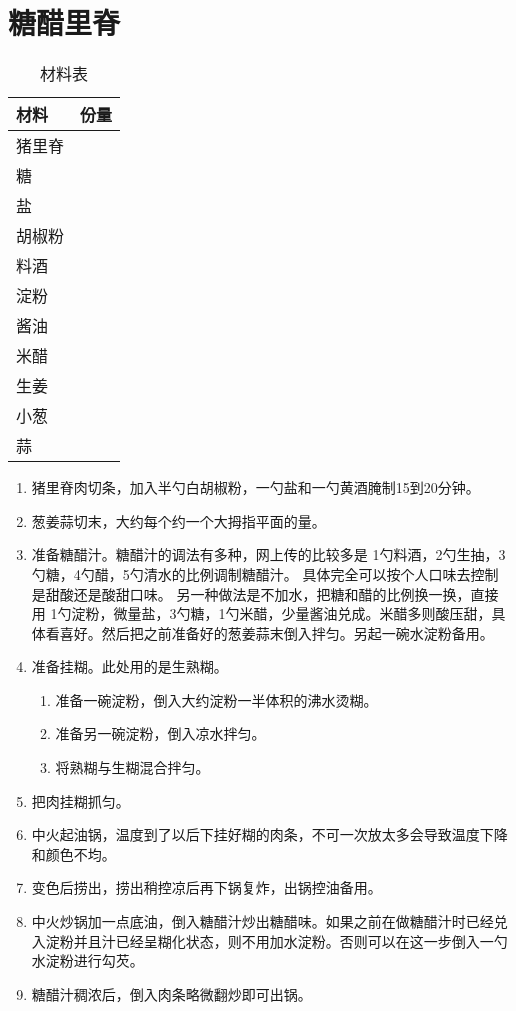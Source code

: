 \section{糖醋里脊}

\begin{table}[h]
    \centering
    \begin{tabular}{|l||c|}\hline
     \textbf{材料}    &  \textbf{份量}\\ \hline\hline
    猪里脊    &  \\ \hline
    糖     &   \\ \hline
    盐     &   \\ \hline
    胡椒粉     &   \\ \hline
    料酒     &   \\ \hline
    淀粉     &   \\ \hline
    酱油     &   \\ \hline
    米醋     &   \\ \hline
    生姜     &   \\ \hline
    小葱     &   \\ \hline
    蒜     &  \\ \hline
    \end{tabular}
    \caption{材料表}
\end{table}


\begin{enumerate}
    \item 猪里脊肉切条，加入半勺白胡椒粉，一勺盐和一勺黄酒腌制15到20分钟。
 
    \item 葱姜蒜切末，大约每个约一个大拇指平面的量。
  
    \item 准备糖醋汁。糖醋汁的调法有多种，网上传的比较多是
    1勺料酒，2勺生抽，3勺糖，4勺醋，5勺清水的比例调制糖醋汁。 具体完全可以按个人口味去控制是甜酸还是酸甜口味。 另一种做法是不加水，把糖和醋的比例换一换，直接用 1勺淀粉，微量盐，3勺糖，1勺米醋，少量酱油兑成。米醋多则酸压甜，具体看喜好。然后把之前准备好的葱姜蒜末倒入拌匀。另起一碗水淀粉备用。
    \item 准备挂糊。此处用的是生熟糊。
    \begin{enumerate}
        \item 准备一碗淀粉，倒入大约淀粉一半体积的沸水烫糊。
        \item 准备另一碗淀粉，倒入凉水拌匀。
        \item 将熟糊与生糊混合拌匀。
    \end{enumerate}
    \item 把肉挂糊抓匀。
    \item 中火起油锅，温度到了以后下挂好糊的肉条，不可一次放太多会导致温度下降和颜色不均。
    \item 变色后捞出，捞出稍控凉后再下锅复炸，出锅控油备用。
    \item 中火炒锅加一点底油，倒入糖醋汁炒出糖醋味。如果之前在做糖醋汁时已经兑入淀粉并且汁已经呈糊化状态，则不用加水淀粉。否则可以在这一步倒入一勺水淀粉进行勾芡。
    \item 糖醋汁稠浓后，倒入肉条略微翻炒即可出锅。
\end{enumerate}


